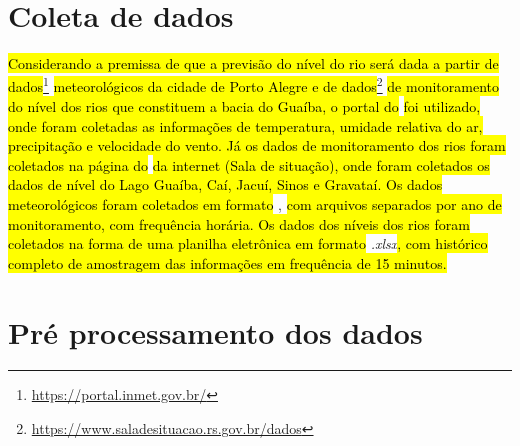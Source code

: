 


\section{Coleta de dados}
\label{sec:coleta_dados}

\hl{Considerando a premissa de que a previsão do nível do rio será dada a partir de dados}\footnote{\url{https://portal.inmet.gov.br/}}\hl{ meteorológicos da cidade de Porto Alegre e de dados}\footnote{\url{https://www.saladesituacao.rs.gov.br/dados}} \hl{de monitoramento do nível dos rios que constituem a bacia do Guaíba, o portal do } \hl{foi utilizado, onde foram coletadas as informações de temperatura, umidade relativa do ar, precipitação e velocidade do vento. Já os dados de monitoramento dos rios foram coletados na página do}  \hl{da internet (Sala de situação), onde foram coletados os dados de nível do Lago Guaíba, Caí, Jacuí, Sinos e Gravataí. Os dados meteorológicos foram coletados em formato} ,\hl{ com arquivos separados por ano de monitoramento, com frequência horária. Os dados dos níveis dos rios foram coletados na forma de uma planilha eletrônica em formato} \textit{.xlsx}\hl{, com histórico completo de amostragem das informações em frequência de 15 minutos.}

\section{Pré processamento dos dados}
\label{sec:pre_processamento_dos_dados}

